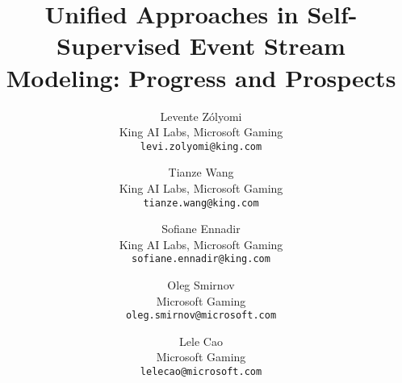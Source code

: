\documentclass[twoside,11pt]{article}
\begin{document}
\title{Unified Approaches in Self-Supervised Event Stream Modeling: Progress and Prospects}

\author{
    Levente Z\'{o}lyomi\\
    King AI Labs, Microsoft Gaming\\
    \texttt{levi.zolyomi@king.com}
    \and
    Tianze Wang\\
    King AI Labs, Microsoft Gaming\\
    \texttt{tianze.wang@king.com}
    \and
    Sofiane Ennadir\\
    King AI Labs, Microsoft Gaming\\
    \texttt{sofiane.ennadir@king.com}
    \and
    Oleg Smirnov\\
    Microsoft Gaming\\
    \texttt{oleg.smirnov@microsoft.com}
    \and
    Lele Cao\\
    Microsoft Gaming\\
    \texttt{lelecao@microsoft.com}
}




\maketitle
\end{document}
